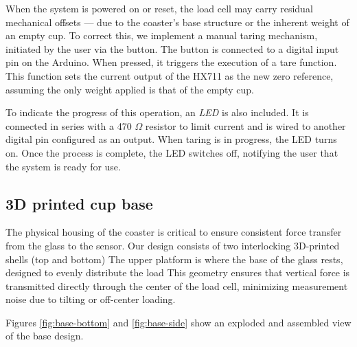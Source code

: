 When the system is powered on or reset, the load cell may carry residual mechanical offsets — due to the coaster’s base structure or the inherent weight of an empty cup. To correct this, we implement a manual taring mechanism, initiated by the user via the button.
The button is connected to a digital input pin on the Arduino. When pressed, it triggers the execution of a tare function. This function sets the current output of the HX711 as the new zero reference, assuming the only weight applied is that of the empty cup.

To indicate the progress of this operation, an \textit{LED} is also included. It is connected in series with a 470 $\Omega$ resistor to limit current and is wired to another digital pin configured as an output. When taring is in progress, the LED turns on. Once the process is complete, the LED switches off, notifying the user that the system is ready for use.

\subsection{3D printed cup base}
The physical housing of the coaster is critical to ensure consistent force transfer from the glass to the sensor. Our design consists of two interlocking 3D-printed shells (top and bottom) The upper platform is where the base of the glass rests, designed to evenly distribute the load
This geometry ensures that vertical force is transmitted directly through the center of the load cell, minimizing measurement noise due to tilting or off-center loading.

Figures \ref{fig:base-bottom} and \ref{fig:base-side} show an exploded and assembled view of the base design.

